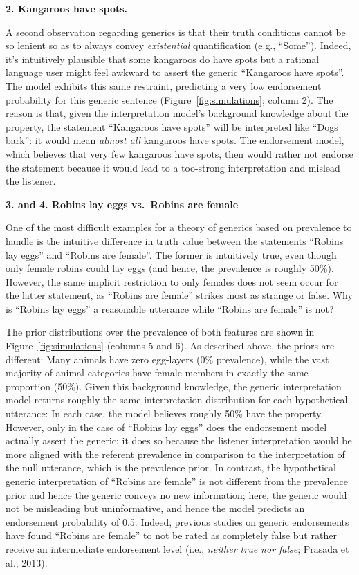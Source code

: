 \documentclass[english,,man,floatsintext]{apa6}
\theoremstyle{definition}
\theoremstyle{definition}
\theoremstyle{definition}
\theoremstyle{remark}
\begin{document}
\textbf{2. Kangaroos have spots.}

A second observation regarding generics is that their truth conditions
cannot be so lenient so as to always convey \emph{existential}
quantification (e.g., \enquote{Some}). Indeed, it's intuitively
plausible that some kangaroos do have spots but a rational language user
might feel awkward to assert the generic \enquote{Kangaroos have spots}.
The model exhibits this same restraint, predicting a very low
endorsement probability for this generic sentence
(Figure~\ref{fig:simulations}; column 2). The reason is that, given the
interpretation model's background knowledge about the property, the
statement \enquote{Kangaroos have spots} will be interpreted like
\enquote{Dogs bark}: it would mean \emph{almost all} kangaroos have
spots. The endorsement model, which believes that very few kangaroos
have spots, then would rather not endorse the statement because it would
lead to a too-strong interpretation and mislead the listener.

\textbf{3. and 4. Robins lay eggs vs.~Robins are female}

One of the most difficult examples for a theory of generics based on
prevalence to handle is the intuitive difference in truth value between
the statements \enquote{Robins lay eggs} and \enquote{Robins are
female}. The former is intuitively true, even though only female robins
could lay eggs (and hence, the prevalence is roughly 50\%). However, the
same implicit restriction to only females does not seem occur for the
latter statement, as \enquote{Robins are female} strikes most as strange
or false. Why is \enquote{Robins lay eggs} a reasonable utterance while
\enquote{Robins are female} is not?

The prior distributions over the prevalence of both features are shown
in Figure~\ref{fig:simulations} (columns 5 and 6). As described above,
the priors are different: Many animals have zero egg-layers (0\%
prevalence), while the vast majority of animal categories have female
members in exactly the same proportion (50\%). Given this background
knowledge, the generic interpretation model returns roughly the same
interpretation distribution for each hypothetical utterance: In each
case, the model believes roughly 50\% have the property. However, only
in the case of \enquote{Robins lay eggs} does the endorsement model
actually assert the generic; it does so because the listener
interpretation would be more aligned with the referent prevalence in
comparison to the interpretation of the null utterance, which is the
prevalence prior. In contrast, the hypothetical generic interpretation
of \enquote{Robins are female} is not different from the prevalence
prior and hence the generic conveys no new information; here, the
generic would not be misleading but uninformative, and hence the model
predicts an endorsement probability of 0.5. Indeed, previous studies on
generic endorsements have found \enquote{Robins are female} to not be
rated as completely false but rather receive an intermediate endorsement
level (i.e., \emph{neither true nor false}; Prasada et al., 2013).
\end{document}
